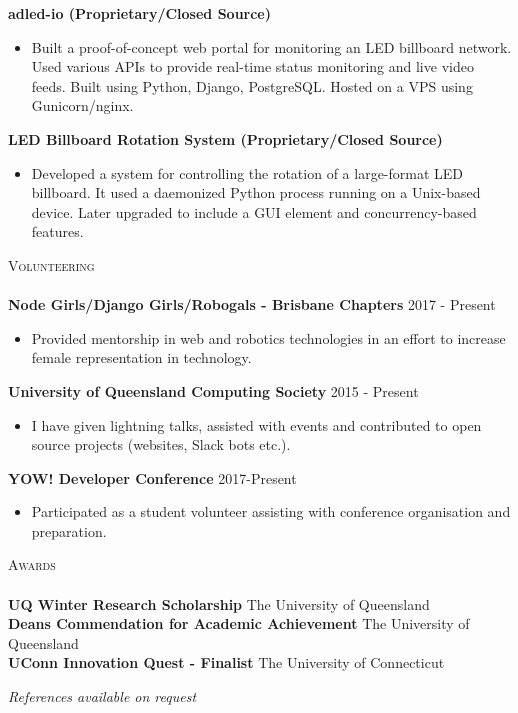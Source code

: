 \documentclass[a4paper]{article}
\newcommand{\lineunder} {
    \vspace*{-8pt} \\
    \hspace*{-10pt} \hrulefill \\
}
\newcommand{\header} [1] {
    {\hspace*{-10pt}\vspace*{6pt} \textsc{#1}}
    \vspace*{-6pt} \lineunder
}
\newenvironment{singleitem}
{   \small
    \vspace{-2.6pt}
    \begin{itemize}
    \setlength{\itemsep}{0pt}
    \setlength{\parskip}{0pt}
    \setlength{\parsep}{0pt}   }
{\end{itemize} \vspace{-2.6pt}	}
\begin{document}
\textbf{adled-io (Proprietary/Closed Source)}
\begin{singleitem}
	\item Built a proof-of-concept web portal for monitoring an LED billboard network. Used various APIs to provide real-time status monitoring and live video feeds. Built using Python, Django, PostgreSQL. Hosted on a VPS using Gunicorn/nginx.
\end{singleitem}

\textbf{LED Billboard Rotation System (Proprietary/Closed Source)}
\begin{singleitem}
	\item Developed a system for controlling the rotation of a large-format LED billboard. It used a daemonized Python process running on a Unix-based device. Later upgraded to include a GUI element and concurrency-based features.
\end{singleitem}

\vspace{1mm}

\header{Volunteering}
\textbf{Node Girls/Django Girls/Robogals - Brisbane Chapters} \hfill 2017 - Present\\
\begin{singleitem}
	\item Provided mentorship in web and robotics technologies in an effort to increase female representation in technology.
\end{singleitem}
\textbf{University of Queensland Computing Society} \hfill 2015 - Present\\
\begin{singleitem}
	\item I have given lightning talks, assisted with events and contributed to open source projects (websites, Slack bots etc.).
\end{singleitem}
\textbf{YOW! Developer Conference} \hfill 2017-Present\\
\begin{singleitem}
	\item Participated as a student volunteer assisting with conference organisation and preparation.
\end{singleitem}

\header{Awards}
\textbf{UQ Winter Research Scholarship} \hfill The University of Queensland\\
\textbf{Dean\textquotesingle{}s Commendation for Academic Achievement} \hfill The University of Queensland\\
\textbf{UConn Innovation Quest - Finalist} \hfill The University of Connecticut\\

\vspace{3mm}
\begin{center}
\small \textit{References available on request}
\end{center}
\end{document}
